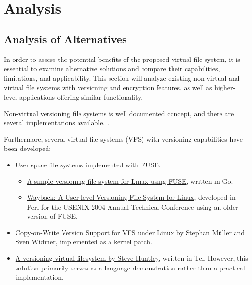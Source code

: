 \chapter{Analysis}
\label{chap:analysis}

\section{Analysis of Alternatives}\label{sec:alternatives}

In order to assess the potential benefits of the proposed virtual file system, it is essential to examine alternative solutions and compare their capabilities, limitations, and applicability.
This section will analyze existing non-virtual and virtual file systems with versioning and encryption features, as well as higher-level applications offering similar functionality.

Non-virtual versioning file systems is well documented concept, and there are several implementations available.
.

Furthermore, several virtual file systems (VFS) with versioning capabilities have been developed:

\begin{itemize}
    \item User space file systems implemented with FUSE:
    \begin{itemize}
        \item \href{https://github.com/FooSoft/vfs}{A simple versioning file system for Linux using FUSE}, written in Go.
        \item \href{https://www.usenix.org/legacy/events/usenix04/tech/freenix/cornell.html}{Wayback: A User-level Versioning File System for Linux}, developed in Perl for the USENIX 2004 Annual Technical Conference using an older version of FUSE.
    \end{itemize}
    \item \href{https://osm.hpi.de/vvfs/}{Copy-on-Write Version Support for VFS under Linux} by Stephan Müller and Sven Widmer, implemented as a kernel patch.
    \item \href{https://wiki.tcl-lang.org/page/A+versioning+virtual+filesystem}{A versioning virtual filesystem by Steve Huntley}, written in Tcl.
    However, this solution primarily serves as a language demonstration rather than a practical implementation.
\end{itemize}

